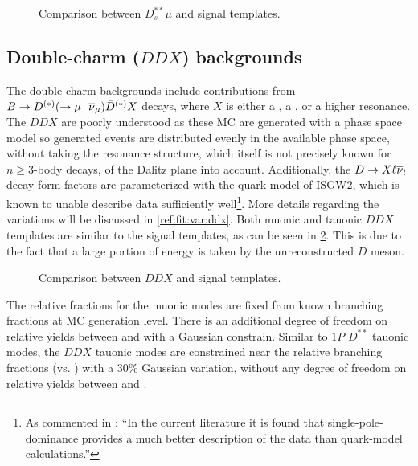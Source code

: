 \begin{figure}[!htb]

    \caption{Comparison between $D_s^{**}\mu$ and \Dz\taum signal templates.}
    \label{fig:d_s-vs-d0-sig}
\end{figure}


\subsection{Double-charm ($DDX$) backgrounds}
\label{ref:fit:tmpl:ddx}

The double-charm backgrounds include contributions from
$B \rightarrow D^{(*)}(\rightarrow {\ensuremath{\mu^-}}{\ensuremath{{\overline{\nu}}_\mu}})\bar{D}^{(*)} X$ decays, where $X$
is either a \kaon, a \Kstar, or a higher \Kstar resonance.
The $DDX$ are poorly understood as these MC are generated with
a phase space model so generated events are distributed evenly in the available
phase space, without taking the resonance structure,
which itself is not precisely known for $n \geq 3$-body decays,
of the Dalitz plane into account.
Additionally, the $D \rightarrow X \ell{\ensuremath{{\overline{\nu}}_l}}$ decay form factors are
parameterized with the quark-model of ISGW2,
which is known to unable describe data sufficiently well\footnote{
    As commented in \cite{LHCb-ANA-2020-056}:
    ``In the current literature it is found that single-pole-dominance provides
    a much better description of the data than quark-model calculations.''
}.
More details regarding the variations will be discussed in
\cref{ref:fit:var:ddx}.
Both muonic and tauonic $DDX$ templates are similar to the signal templates,
as can be seen in \cref{fig:ddx-vs-d0-sig}.
This is due to the fact that a large portion of energy is taken by the
unreconstructed $D$ meson.

\begin{figure}[!htb]

    \caption{Comparison between $DDX$ and \Dz\taum signal templates.}
    \label{fig:ddx-vs-d0-sig}
\end{figure}


The relative fractions for the muonic modes are fixed from known branching
fractions at MC generation level.
There is an additional degree of freedom on relative yields between \Bm and \Bzb
with a Gaussian constrain.
Similar to $1P$ $D^{**}$ tauonic modes,
the $DDX$ tauonic modes are constrained near the relative branching fractions
(\tauon vs. \muon) with a 30\% Gaussian variation,
without any degree of freedom on relative yields between \Bm and \Bzb.
